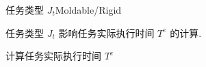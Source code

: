 \begin{frame}[fragile]{任务类型 $J_t$}{Moldable/Rigid}

    任务类型 $J_t$ 影响任务实际执行时间 $T^e$ 的计算.

    \centering
    \begin{minipage}{0.7\textwidth}
        \IncMargin{1.5em}
        \begin{algorithm}[H]
            \SetAlgoLined
            \caption{计算任务实际执行时间 $T^e$}
        \end{algorithm}
        \DecMargin{1.5em}
    \end{minipage}

\end{frame}
